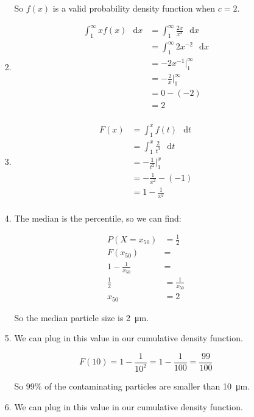 \documentclass[12pt,letterpaper]{article}
\newcommand*\dif{\mathop{}\!\mathrm{d}}
\begin{document}
\begin{enumerate}
\begin{enumerate}
\begin{enumerate}[label=(\arabic*)]
              So $f(x)$ is a valid probability density function when $c = 2$.
            \item
              \begin{align*}
                \int_1^\infty \! x f(x) \, \dif x &= \int_1^\infty \! \frac{2x}{x^3} \, \dif x \\
                &= \int_1^\infty \! 2x^{-2} \, \dif x \\
                &= -2x^{-1} \Big|_1^\infty \\
                &= -\frac{2}{x} \Big|_1^\infty \\
                &= 0 - (-2) \\
                &= 2 \\
              \end{align*}
            \item
              \begin{align*}
                F(x) &= \int_1^x \! f(t) \, \dif t \\
                &= \int_1^x \! \frac{2}{t^3} \, \dif t \\
                &= -\frac{1}{t^2} \Big|_1^x \\
                &= -\frac{1}{x^2} - (-1) \\
                &= 1 - \frac{1}{x^2} \\
              \end{align*}
            \item
              The median is the  percentile,
              so we can find:

              \begin{align*}
                P(X = x_{50}) &= \frac{1}{2} \\
                F(x_{50}) &= \\
                1 - \frac{1}{x_{50}} &= \\
                \frac{1}{2} &= \frac{1}{x_{50}} \\
                x_{50} &= 2
              \end{align*}

              So the median particle size is \SI{2}{\micro\meter}.
            \item
              We can plug in this value in our cumulative density function.

              \[
                F(10) = 1 - \frac{1}{10^2} = 1 - \frac{1}{100} = \frac{99}{100}
              \]

              So $99\%$ of the contaminating particles are smaller than \SI{10}{\micro\meter}.
            \item
              We can plug in this value in our cumulative density function.


\end{enumerate}
\end{enumerate}
\end{enumerate}
\end{document}

